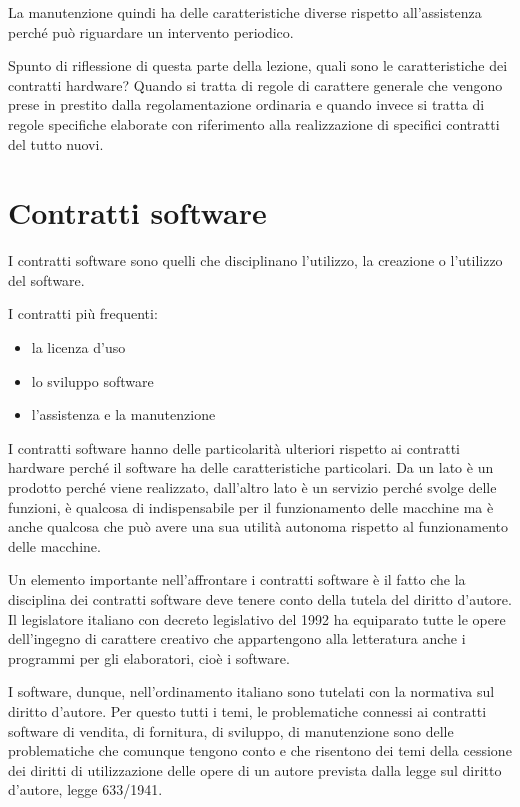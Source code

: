 \begin{itemize}
La manutenzione quindi ha delle caratteristiche diverse rispetto all'assistenza perché può riguardare un intervento periodico. 

Spunto di riflessione di questa parte della lezione, quali sono le caratteristiche dei contratti hardware? Quando si tratta di regole di carattere generale che vengono prese in prestito dalla regolamentazione ordinaria e quando invece si tratta di regole specifiche elaborate con riferimento alla realizzazione di specifici contratti del tutto nuovi. 

\section{Contratti software}

I contratti software sono quelli che disciplinano l'utilizzo, la creazione o l'utilizzo del software. 

I contratti più frequenti: 
\begin{itemize}
    \item la licenza d'uso
    \item lo sviluppo software
    \item l'assistenza e la manutenzione
\end{itemize}

I contratti software hanno delle particolarità ulteriori rispetto ai contratti hardware perché il software ha delle caratteristiche particolari. Da un lato è un prodotto perché viene realizzato, dall'altro lato è un servizio perché svolge delle funzioni, è qualcosa di indispensabile per il funzionamento delle macchine ma è anche qualcosa che può avere una sua utilità autonoma rispetto al funzionamento delle macchine. 

Un elemento importante nell'affrontare i contratti software è il fatto che la disciplina dei contratti software deve tenere conto della tutela del diritto d'autore. Il legislatore italiano con decreto legislativo del 1992 ha equiparato tutte le opere dell'ingegno di carattere creativo che appartengono alla letteratura anche i programmi per gli elaboratori, cioè i software. 

I software, dunque, nell'ordinamento italiano sono tutelati con la normativa sul diritto d'autore. Per questo tutti i temi, le problematiche connessi ai contratti software di vendita, di fornitura, di sviluppo, di manutenzione sono delle problematiche che comunque tengono conto e che risentono dei temi della cessione dei diritti di utilizzazione delle opere di un autore prevista dalla legge sul diritto d'autore, legge 633/1941. 


\end{itemize}
